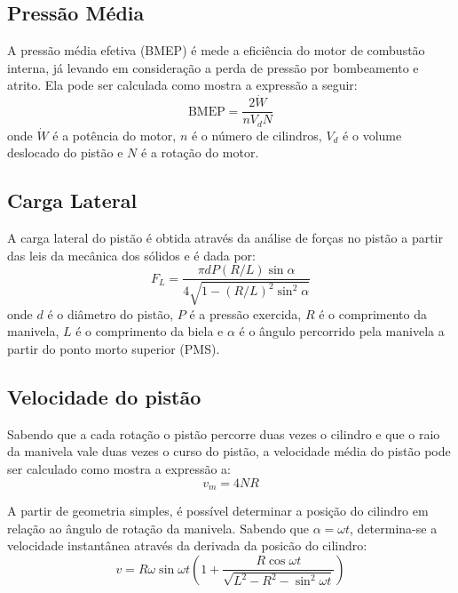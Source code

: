 \subsection{Pressão Média}

A pressão média efetiva (BMEP) é mede a eficiência do motor de combustão interna, já levando em consideração a perda de pressão por bombeamento e atrito. Ela pode ser calculada como mostra a expressão a seguir:
%
\begin{equation}
    \text{BMEP} = \frac{2 \dot{W}}{n V_d N}
    \label{eq:bmep}
\end{equation}
%
onde $\dot{W}$ é a potência do motor, $n$ é o número de cilindros, $V_d$ é o volume deslocado do pistão e $N$ é a rotação do motor.

\subsection{Carga Lateral}

A carga lateral do pistão é obtida através da análise de forças no pistão a partir das leis da mecânica dos sólidos e é dada por:
%
\begin{equation}
    F_L = \frac{\pi d P (R/L) \sin\alpha}{4\sqrt{1-(R/L)^2\sin^2\alpha}}
    \label{eq:carga_lateral}
\end{equation}
%
onde $d$ é o diâmetro do pistão, $P$ é a pressão exercida, $R$ é o comprimento da manivela, $L$ é o comprimento da biela e $\alpha$ é o ângulo percorrido pela manivela a partir do ponto morto superior (PMS).

\subsection{Velocidade do pistão}

Sabendo que a cada rotação o pistão percorre duas vezes o cilindro e que o raio da manivela vale duas vezes o curso do pistão, a velocidade média do pistão pode ser calculado como mostra a expressão a:
%
\begin{equation}
    v_m = 4NR
    \label{eq:velocidade_media}
\end{equation}

A partir de geometria simples, é possível determinar a posição do cilindro em relação ao ângulo de rotação da manivela. Sabendo que $\alpha=\omega t$, determina-se a velocidade instantânea através da derivada da posicão do cilindro:
%
\begin{equation}
    v = R\omega\sin\omega t \left( 1 + \dfrac{R\cos\omega t}{\sqrt{L^2-R^2-\sin^2\omega t}} \right)
    \label{eq:velocidade}
\end{equation}

